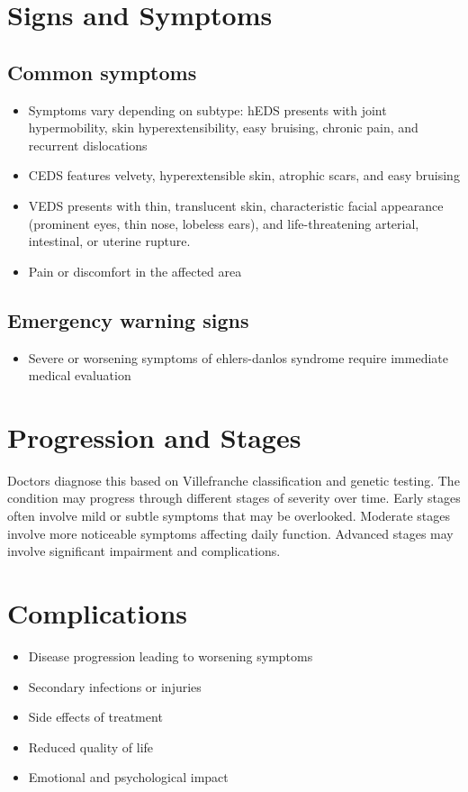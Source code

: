\section{Signs and Symptoms}

\subsection{Common symptoms}
\begin{itemize}[noitemsep]
  \item Symptoms vary depending on subtype: hEDS presents with joint hypermobility, skin hyperextensibility, easy bruising, chronic pain, and recurrent dislocations
  \item CEDS features velvety, hyperextensible skin, atrophic scars, and easy bruising
  \item VEDS presents with thin, translucent skin, characteristic facial appearance (prominent eyes, thin nose, lobeless ears), and life-threatening arterial, intestinal, or uterine rupture.
  \item Pain or discomfort in the affected area
  \end{itemize}

\subsection{Emergency warning signs}
\begin{itemize}[noitemsep]
  \item Severe or worsening symptoms of ehlers-danlos syndrome require immediate medical evaluation
\end{itemize}
\section{Progression and Stages}
Doctors diagnose this based on Villefranche classification and genetic testing. The condition may progress through different stages of severity over time. Early stages often involve mild or subtle symptoms that may be overlooked. Moderate stages involve more noticeable symptoms affecting daily function. Advanced stages may involve significant impairment and complications.
\section{Complications}
\begin{itemize}[noitemsep]
  \item Disease progression leading to worsening symptoms
  \item Secondary infections or injuries
  \item Side effects of treatment
  \item Reduced quality of life
  \item Emotional and psychological impact
\end{itemize}
